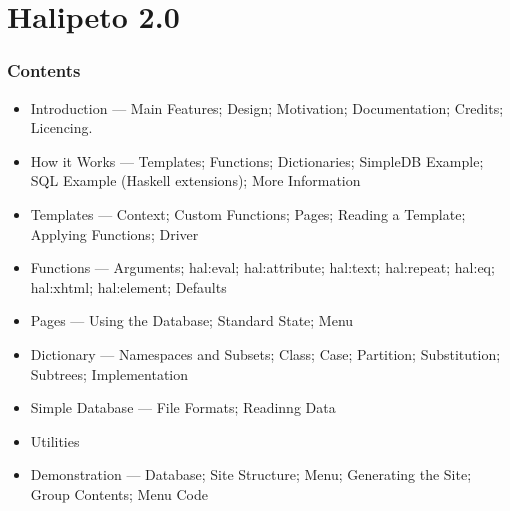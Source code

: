 \documentclass[letterpaper,11pt]{article}
\begin{document}
\part{Halipeto 2.0}

\section{Contents}

\begin{itemize}

\item Introduction --- Main Features; Design; Motivation;
Documentation; Credits; Licencing.

\item How it Works --- Templates; Functions; Dictionaries; SimpleDB
Example; SQL Example (Haskell extensions); More Information

\item Templates --- Context; Custom Functions; Pages; Reading a
Template; Applying Functions; Driver

\item Functions --- Arguments; hal:eval; hal:attribute; hal:text;
hal:repeat; hal:eq; hal:xhtml; hal:element; Defaults

\item Pages --- Using the Database; Standard State; Menu

\item Dictionary --- Namespaces and Subsets; Class; Case; Partition;
Substitution; Subtrees; Implementation

\item Simple Database --- File Formats; Readinng Data

\item Utilities

\item Demonstration --- Database; Site Structure; Menu; Generating the
Site; Group Contents; Menu Code

\end{itemize}



\vfill\eject



\vfill\eject



\vfill\eject



\vfill\eject



\vfill\eject



\vfill\eject



\vfill\eject



\vfill\eject


\end{document}
